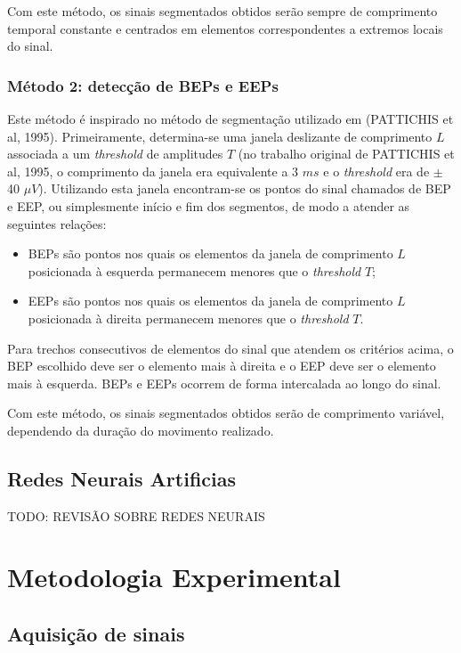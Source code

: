 \documentclass[
	12pt,				%
	openright,			%
	oneside,
	a4paper,			%
	english,			%
	francais,			%
	spanish,			%
	brazil				%
	]{abntex2}
\begin{document}
	Com este método, os sinais segmentados obtidos serão sempre de comprimento temporal constante e centrados em elementos correspondentes a extremos locais do sinal.

\subsection{Método 2: detecção de BEPs e EEPs}

	Este método é inspirado no método de segmentação utilizado em (PATTICHIS et al, 1995). Primeiramente, determina-se uma janela deslizante de comprimento $L$ associada a um \emph{threshold} de amplitudes $T$ (no trabalho original de PATTICHIS et al, 1995, o comprimento da janela era equivalente a 3 $ms$ e o \emph{threshold} era de $\pm$ 40 $\mu V$). Utilizando esta janela encontram-se os pontos do sinal chamados de BEP e EEP, ou simplesmente início e fim dos segmentos, de modo a atender as seguintes relações:

\begin{itemize}
\item{BEPs são pontos nos quais os elementos da janela de comprimento $L$ posicionada à esquerda permanecem menores que o \emph{threshold} $T$;}
\item{EEPs são pontos nos quais os elementos da janela de comprimento $L$ posicionada à direita permanecem menores que o \emph{threshold} $T$.}
\end{itemize}

	Para trechos consecutivos de elementos do sinal que atendem os critérios acima, o BEP escolhido deve ser o elemento mais à direita e o EEP deve ser o elemento mais à esquerda. BEPs e EEPs ocorrem de forma intercalada ao longo do sinal.
	
	Com este método, os sinais segmentados obtidos serão de comprimento variável, dependendo da duração do movimento realizado.
\section{Redes Neurais Artificias}

	TODO: REVISÃO SOBRE REDES NEURAIS

\chapter{Metodologia Experimental}

\section{Aquisição de sinais}
\end{document}
